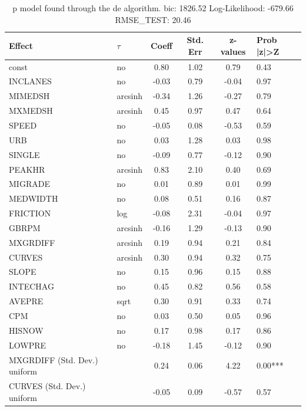 \begin{table}
	\caption{p model found through the de algorithm. bic: 1826.52 Log-Likelihood: -679.66 RMSE_TEST: 20.46}
	\begin{center}
		\begin{tabular}{|l|l|c|c|c|l|}
			\hline
			Effect & $\tau$ & Coeff & Std. Err & z-values & Prob |z|>Z \\
			\hline
			const & no & 0.80 & 1.02 & 0.79 & 0.43 \\
			\hline
			INCLANES & no & -0.03 & 0.79 & -0.04 & 0.97 \\
			\hline
			MIMEDSH & arcsinh & -0.34 & 1.26 & -0.27 & 0.79 \\
			\hline
			MXMEDSH & arcsinh & 0.45 & 0.97 & 0.47 & 0.64 \\
			\hline
			SPEED & no & -0.05 & 0.08 & -0.53 & 0.59 \\
			\hline
			URB & no & 0.03 & 1.28 & 0.03 & 0.98 \\
			\hline
			SINGLE & no & -0.09 & 0.77 & -0.12 & 0.90 \\
			\hline
			PEAKHR & arcsinh & 0.83 & 2.10 & 0.40 & 0.69 \\
			\hline
			MIGRADE & no & 0.01 & 0.89 & 0.01 & 0.99 \\
			\hline
			MEDWIDTH & no & 0.08 & 0.51 & 0.16 & 0.87 \\
			\hline
			FRICTION & log & -0.08 & 2.31 & -0.04 & 0.97 \\
			\hline
			GBRPM & arcsinh & -0.16 & 1.29 & -0.13 & 0.90 \\
			\hline
			MXGRDIFF & arcsinh & 0.19 & 0.94 & 0.21 & 0.84 \\
			\hline
			CURVES & arcsinh & 0.30 & 0.94 & 0.32 & 0.75 \\
			\hline
			SLOPE & no & 0.15 & 0.96 & 0.15 & 0.88 \\
			\hline
			INTECHAG & no & 0.45 & 0.82 & 0.56 & 0.58 \\
			\hline
			AVEPRE & sqrt & 0.30 & 0.91 & 0.33 & 0.74 \\
			\hline
			CPM & no & 0.03 & 0.50 & 0.05 & 0.96 \\
			\hline
			HISNOW & no & 0.17 & 0.98 & 0.17 & 0.86 \\
			\hline
			LOWPRE & no & -0.18 & 1.45 & -0.12 & 0.90 \\
			\hline
			MXGRDIFF (Std. Dev.) uniform &  & 0.24 & 0.06 & 4.22 & 0.00*** \\
			\hline
			CURVES (Std. Dev.) uniform &  & -0.05 & 0.09 & -0.57 & 0.57 \\

\end{tabular}
\end{center}
\end{table}
